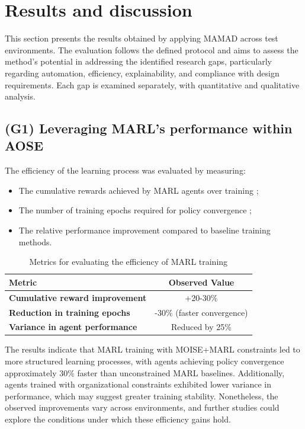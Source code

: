 \documentclass[pdflatex,sn-mathphys-num]{sn-jnl}%
\theoremstyle{thmstyleone}%
\theoremstyle{thmstyletwo}%
\theoremstyle{thmstylethree}%
\begin{document}
\section{Results and discussion} \label{sec:results}

This section presents the results obtained by applying MAMAD across test environments. The evaluation follows the defined protocol and aims to assess the method's potential in addressing the identified research gaps, particularly regarding automation, efficiency, explainability, and compliance with design requirements. Each gap is examined separately, with quantitative and qualitative analysis.

\subsection{(G1) Leveraging MARL's performance within AOSE}

The efficiency of the learning process was evaluated by measuring:
\begin{itemize}
    \item The cumulative rewards achieved by MARL agents over training ;
    \item The number of training epochs required for policy convergence ;
    \item The relative performance improvement compared to baseline training methods.
\end{itemize}

\begin{table}[h!]
    \centering
    \caption{Metrics for evaluating the efficiency of MARL training}
    \begin{tabular}{lc}
        \hline
        \textbf{Metric}                        & \textbf{Observed Value}    \\
        \hline
        \textbf{Cumulative reward improvement} & +20-30\%                   \\
        \hline
        \textbf{Reduction in training epochs}  & -30\% (faster convergence) \\
        \hline
        \textbf{Variance in agent performance} & Reduced by 25\%            \\
        \hline
    \end{tabular}
    \label{tab:efficiency}
\end{table}

The results indicate that MARL training with MOISE+MARL constraints led to more structured learning processes, with agents achieving policy convergence approximately 30\% faster than unconstrained MARL baselines. Additionally, agents trained with organizational constraints exhibited lower variance in performance, which may suggest greater training stability. Nonetheless, the observed improvements vary across environments, and further studies could explore the conditions under which these efficiency gains hold.
\end{document}
